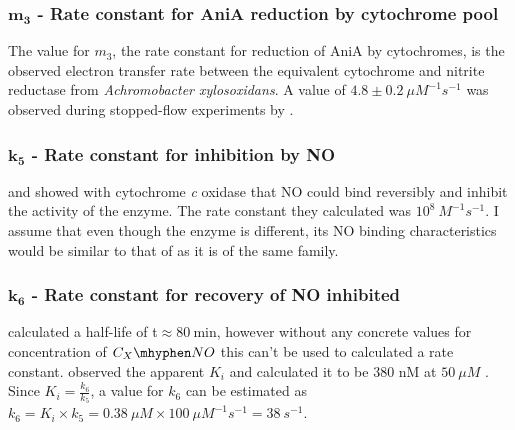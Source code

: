 \subsubsection*{$\mathbf{m_3}$ {\bf- Rate constant for AniA reduction by cytochrome pool}}
The value for $m_3$, the rate constant for reduction of AniA by cytochromes, is the observed electron transfer rate between the equivalent cytochrome and nitrite reductase from \textit{Achromobacter xylosoxidans}. A value of $4.8\pm0.2~\mu M^{-1}s^{-1}$ was observed during stopped-flow experiments by \citet{Nojiri2009}.

\subsubsection*{$\mathbf{k_5}$ {\bf- Rate constant for \cbbthree{} inhibition by NO}}
\citet{Giuffre2000} and \citet{Blackmore1991} showed with cytochrome \textit{c} oxidase that NO could bind reversibly and inhibit the activity of the enzyme. The rate constant they calculated was $10^8~M ^{-1} s ^{-1}$. I assume that even though the enzyme is different, its NO binding characteristics would be similar to that of \cbbthree{} as it is of the same family.

\subsubsection*{$\mathbf{k_6}$ {\bf- Rate constant for recovery of NO inhibited \cbbthree{}}}
\citet{Giuffre2000} calculated a half-life of t\textonehalf $\approx 80~\mathrm{min}$, however without any concrete values for concentration of $C_X\mhyphen NO$ this can't be used to calculated a rate constant.
\citet{Rock2005} observed the apparent $K_i$ and calculated it to be 380 nM at $50~\mu M$ \cOxygen{}. Since $K_i = \frac{k_6}{k_5}$, a value for $k_6$ can be estimated as $k_6 = K_i \times k_5 = 0.38~\mu M \times 100~\mu M^{-1}s^{-1} = 38~s^{-1}$.

